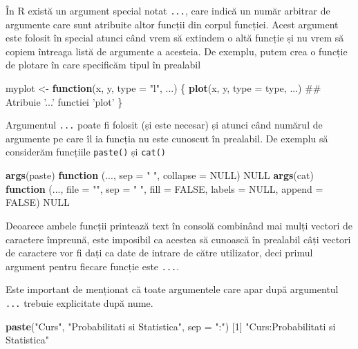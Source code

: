 \documentclass[]{article}
\newenvironment{Shaded}{\begin{snugshade}}{\end{snugshade}}
\newcommand{\KeywordTok}[1]{\textcolor[rgb]{0.13,0.29,0.53}{\textbf{#1}}}
\newcommand{\DataTypeTok}[1]{\textcolor[rgb]{0.13,0.29,0.53}{#1}}
\newcommand{\DecValTok}[1]{\textcolor[rgb]{0.00,0.00,0.81}{#1}}
\newcommand{\StringTok}[1]{\textcolor[rgb]{0.31,0.60,0.02}{#1}}
\newcommand{\OtherTok}[1]{\textcolor[rgb]{0.56,0.35,0.01}{#1}}
\newcommand{\ControlFlowTok}[1]{\textcolor[rgb]{0.13,0.29,0.53}{\textbf{#1}}}
\newcommand{\NormalTok}[1]{#1}
\begin{document}
În R există un argument special notat \texttt{...}, care indică un număr
arbitrar de argumente care sunt atribuite altor funcții din corpul
funcției. Acest argument este folosit în special atunci când vrem să
extindem o altă funcție și nu vrem să copiem întreaga listă de argumente
a acesteia. De exemplu, putem crea o funcție de plotare în care
specificăm tipul în prealabil

\begin{Shaded}
\begin{Highlighting}[]
\NormalTok{myplot <-}\StringTok{ }\ControlFlowTok{function}\NormalTok{(x, y, }\DataTypeTok{type =} \StringTok{"l"}\NormalTok{, ...) \{}
        \KeywordTok{plot}\NormalTok{(x, y, }\DataTypeTok{type =}\NormalTok{ type, ...)         ## Atribuie '...' functiei 'plot'}
\NormalTok{\}}
\end{Highlighting}
\end{Shaded}

Argumentul \texttt{...} poate fi folosit (și este necesar) și atunci
când numărul de argumente pe care îl ia funcția nu este cunoscut în
prealabil. De exemplu să considerăm funcțiile \texttt{paste()} și
\texttt{cat()}

\begin{Shaded}
\begin{Highlighting}[]
\KeywordTok{args}\NormalTok{(paste)}
\ControlFlowTok{function}\NormalTok{ (..., }\DataTypeTok{sep =} \StringTok{" "}\NormalTok{, }\DataTypeTok{collapse =} \OtherTok{NULL}\NormalTok{) }
\OtherTok{NULL}
\KeywordTok{args}\NormalTok{(cat)}
\ControlFlowTok{function}\NormalTok{ (..., }\DataTypeTok{file =} \StringTok{""}\NormalTok{, }\DataTypeTok{sep =} \StringTok{" "}\NormalTok{, }\DataTypeTok{fill =} \OtherTok{FALSE}\NormalTok{, }\DataTypeTok{labels =} \OtherTok{NULL}\NormalTok{, }
    \DataTypeTok{append =} \OtherTok{FALSE}\NormalTok{) }
\OtherTok{NULL}
\end{Highlighting}
\end{Shaded}

Deoarece ambele funcții printează text în consolă combinând mai mulți
vectori de caractere împreună, este imposibil ca acestea să cunoască în
prealabil câți vectori de caractere vor fi dați ca date de intrare de
către utilizator, deci primul argument pentru fiecare funcție este
\texttt{...}.

Este important de menționat că toate argumentele care apar după
argumentul \texttt{...} trebuie explicitate după nume.

\begin{Shaded}
\begin{Highlighting}[]
\KeywordTok{paste}\NormalTok{(}\StringTok{"Curs"}\NormalTok{, }\StringTok{"Probabilitati si Statistica"}\NormalTok{, }\DataTypeTok{sep =} \StringTok{":"}\NormalTok{)}
\NormalTok{[}\DecValTok{1}\NormalTok{] }\StringTok{"Curs:Probabilitati si Statistica"}
\end{Highlighting}
\end{Shaded}
\end{document}
